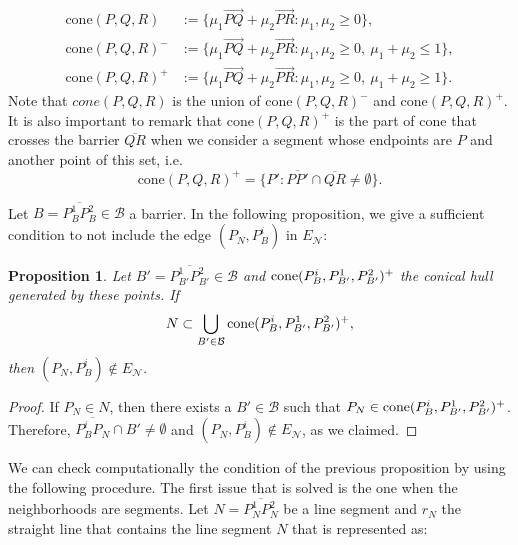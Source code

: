 \documentclass[a4paper]{elsarticle}
\newcommand{\EN}{{E^{}_{\mathcal N}}}
\newtheorem{prop}{Proposition}
\begin{document}
	\begin{align*}
		\text{cone}(P,Q,R)&:=\{\mu_1 \overrightarrow{PQ}+\mu_2\overrightarrow{PR}:\mu_1,\mu_2\geq 0\},\\
		\text{cone}(P,Q,R)^-&:=\{\mu_1 \overrightarrow{PQ}+\mu_2\overrightarrow{PR}:\mu_1,\mu_2\geq 0,\:\mu_1+\mu_2\leq 1\},\\
		\text{cone}(P,Q,R)^+&:=\{\mu_1 \overrightarrow{PQ}+\mu_2\overrightarrow{PR}:\mu_1,\mu_2\geq 0,\:\mu_1+\mu_2\geq 1\}.
	\end{align*}
	Note that $cone(P, Q, R)$ is the union of $\text{cone}(P,Q,R)^-$ and $\text{cone}(P,Q,R)^+$. It is also important to remark that $\text{cone}(P,Q,R)^+$ is the part of cone that crosses the barrier $\overline{QR}$ when we consider a segment whose endpoints are $P$ and another point of this set, i.e.
	$$\text{cone}(P,Q,R)^+=\{P':\overline{PP'}\cap\overline{QR}\neq\emptyset\}.$$
	
	Let $B = \overline{P^1_BP^2_B}\in\mathcal B$ a barrier. In the following proposition, we give a sufficient condition to not include the edge $(P^{}_N, P^i_B)$ in $\EN$:
	
	\begin{prop}
		
		Let $B'=\overline{P^1_{B'}P^2_{B'}}\in\mathcal B$ and $\normalfont{\text{cone}}(P^i_B, P^1_{B'}, P^2_{B'})^+$ the conical hull generated by these points. If
		$$N\subset\bigcup_{B'\in\mathcal B}\normalfont{\text{cone}}(P^i_B, P^1_{B'}, P^2_{B'})^+,$$
		then $(P^{}_N, P^i_B)\not\in \EN$.
		
	\end{prop}
	\begin{proof}
		If $P_N\in N$, then there exists a $B'\in\mathcal B$ such that 
		$P_N\in \normalfont{\text{cone}}(P^i_B, P^1_{B'}, P^2_{B'})^+$. Therefore, $\overline{P^i_B P^{}_N}\cap B'\neq\emptyset$ and $(P^{}_N, P^i_B)\not\in \EN$, as we claimed.
	\end{proof}
	
	We can check computationally the condition of the previous proposition by using the following procedure. The first issue that is solved is the one when the neighborhoods are segments. Let $N = \overline{P^1_N P^2_N}$ be a line segment and $r_N$ the straight line that contains the line segment $N$ that is represented as:
	
\end{document}
